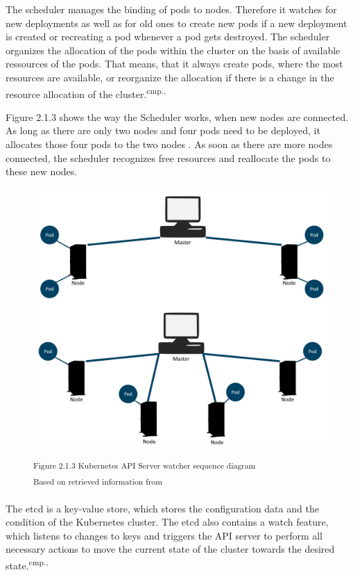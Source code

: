The scheduler manages the binding of pods to nodes. Therefore it watches for new deployments as well as for old ones to create new pods if a new deployment is created or recreating a pod whenever a pod gets destroyed. The scheduler organizes the allocation of the pods within the cluster on the basis of available ressources of the pods. That means, that it always create pods, where the most resources are available, or reorganize the allocation if there is a change in the resource allocation of the cluster.\textsuperscript{cmp.\cite{13}, \cite{16}}%

Figure 2.1.3 shows the way the Scheduler works, when new nodes are connected. As long as there are only two nodes and four pods need to be deployed, it allocates those four pods to the two nodes . As soon as there are more nodes connected, the scheduler recognizes free resources and reallocate the pods to these new nodes.

\begin{figure}[h]
\centering
\includegraphics[width=\textwidth/5*3]{images/kubernetes_scheduler.png}

\textsuperscript{Figure 2.1.3 Kubernetes API Server watcher sequence diagram} \\
\textsuperscript{Based on retrieved information from \cite{17}}
\end{figure}

The etcd is a key-value store, which stores the configuration data and the condition of the Kubernetes cluster. The etcd also contains a watch feature, which listens to changes to keys and triggers the API server to perform all necessary actions to move the current state of the cluster towards the desired state.\textsuperscript{cmp.\cite{13}, \cite{16}}

